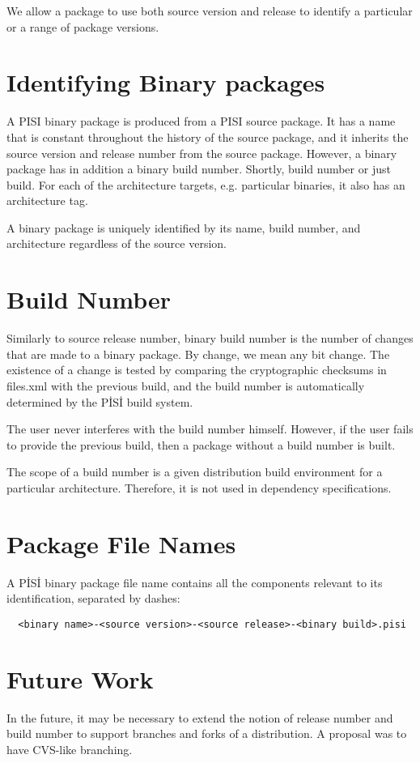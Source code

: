 \documentclass[a4paper,11pt]{article}
\begin{document}
We allow a package to use both source version and release to identify
a particular or a range of package versions.

\section{Identifying Binary packages}

A PISI binary package is produced from a PISI source package. It has a
name that is constant throughout the history of the source package,
and it inherits the source version and release number from the source
package. However, a binary package has in addition a binary build
number. Shortly, build number or just build. For each of the
architecture targets, e.g. particular binaries, it also has an
architecture tag.

A binary package is uniquely identified by its name, build number, and
architecture regardless of the source version.

\section{Build Number}

Similarly to source release number, binary build number is the number
of changes that are made to a binary package. By change, we mean any
bit change.  The existence of a change is tested by comparing the
cryptographic checksums in files.xml with the previous build, and the
build number is automatically determined by the P\.IS\.I build system.

The user never interferes with the build number himself. However, if
the user fails to provide the previous build, then a package without
a build number is built.

The scope of a build number is a given distribution build environment
for a particular architecture. Therefore, it is not used in dependency
specifications.
 
\section{Package File Names}

A P\.IS\.I binary package file name contains all the components relevant
to its identification, separated by dashes:
\begin{verbatim}
  <binary name>-<source version>-<source release>-<binary build>.pisi
\end{verbatim}

\section{Future Work}

In the future, it may be necessary to extend the notion of release
number and build number to support branches and forks of a
distribution. A proposal was to have CVS-like branching.
\end{document}
